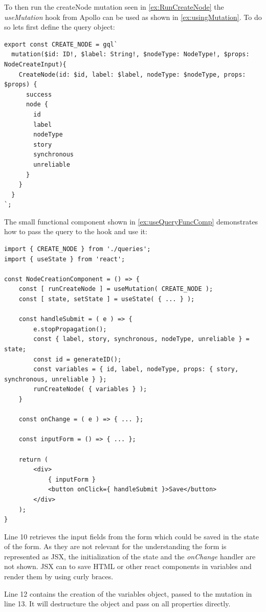 To then run the createNode mutation seen in \autoref{ex:RunCreateNode} the \emph{useMutation} hook from Apollo can be used as shown in \autoref{ex:usingMutation}. To do so lets first define the query object:

\begin{lstlisting}[label={ex:DefQuery},caption={Mutation to Create a Node in the Database}]
export const CREATE_NODE = gql`
  mutation($id: ID!, $label: String!, $nodeType: NodeType!, $props: NodeCreateInput){
    CreateNode(id: $id, label: $label, nodeType: $nodeType, props: $props) {
      success
      node {
        id
        label
        nodeType
        story
        synchronous
        unreliable
      }
    }
  }
`;
\end{lstlisting}
\noindent
The small functional component shown in \autoref{ex:useQueryFuncComp} demonstrates how to pass the query to the hook and use it:
\lstset{language=JavaScript}
\begin{lstlisting}[caption={Using the Query in a Component (no actual application code)},label={ex:useQueryFuncComp},float=h]
import { CREATE_NODE } from './queries';
import { useState } from 'react';

const NodeCreationComponent = () => {
	const [ runCreateNode ] = useMutation( CREATE_NODE );
	const [ state, setState ] = useState( { ... } );
	
	const handleSubmit = ( e ) => {
		e.stopPropagation();
		const { label, story, synchronous, nodeType, unreliable } = state; 
		const id = generateID();
		const variables = { id, label, nodeType, props: { story, synchronous, unreliable } }; 
		runCreateNode( { variables } );
	}

	const onChange = ( e ) => { ... };
	
	const inputForm = () => { ... };
	
	return (
		<div>
			{ inputForm }
			<button onClick={ handleSubmit }>Save</button>
		</div>	
	);
}
\end{lstlisting}
Line 10 retrieves the input fields from the form which could be saved in the state of the form. As they are not relevant for the understanding the form is represented as JSX, the initialization of the state and the \emph{onChange} handler are not shown. JSX can to save HTML or other react components in variables and render them by using curly braces.

Line 12 contains the creation of the variables object, passed to the mutation in line 13. It will destructure the object and pass on all properties directly.

